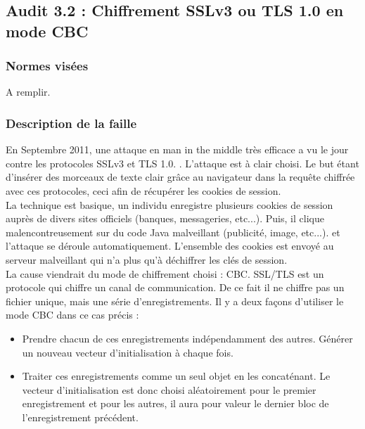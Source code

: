 	\subsection{Audit 3.2 : Chiffrement SSLv3 ou TLS 1.0 en mode CBC}
		\subsubsection{Normes visées}
	
			A remplir.	
	
		\subsubsection{Description de la faille}
			
			En Septembre 2011, une attaque en man in the middle très efficace a vu le jour contre les protocoles SSLv3 et TLS 1.0. \cite{ekr2011beast} \cite{imperial2011beast} \cite{goodin2011beast} \cite{gallagher2011beast}. L'attaque est à clair choisi. Le but étant d'insérer des morceaux de texte clair grâce au navigateur dans la requête chiffrée avec ces protocoles, ceci afin de récupérer les cookies de session.\\
			
			La technique est basique, un individu enregistre plusieurs cookies de session auprès de divers sites officiels (banques, messageries, etc...). Puis, il clique malencontreusement sur du code Java malveillant (publicité, image, etc...). et l'attaque se déroule automatiquement. L'ensemble des cookies est envoyé au serveur malveillant qui n'a plus qu'à déchiffrer les clés de session.\\
			
			La cause viendrait du mode de chiffrement choisi : CBC. SSL/TLS est un protocole qui chiffre un canal de communication.	De ce fait il ne chiffre pas un fichier unique, mais une série d'enregistrements. Il y a deux façons d'utiliser le mode CBC dans ce cas précis :
			\begin{itemize}
			\item Prendre chacun de ces enregistrements indépendamment des autres. Générer un nouveau vecteur d'initialisation à chaque fois.
			\item Traiter ces enregistrements comme un seul objet en les concaténant. Le vecteur d'initialisation est donc choisi aléatoirement pour le premier enregistrement et pour les autres, il aura pour valeur le dernier bloc de l'enregistrement précédent.\\
			
			\end{itemize}
			
